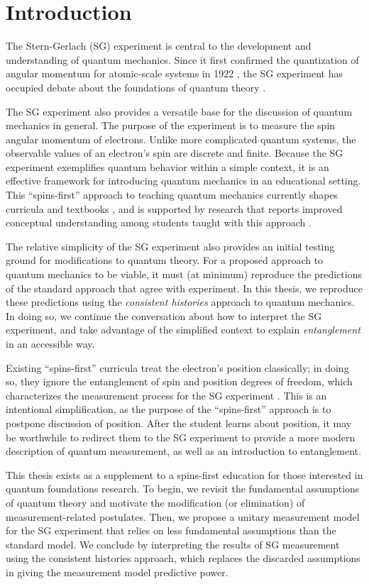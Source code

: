 \chapter{Introduction}

The Stern-Gerlach (SG) experiment is central to the development and understanding of quantum mechanics. Since it first confirmed the quantization of angular momentum for atomic-scale systems in 1922 \cite{stern}, the SG experiment has occupied debate about the foundations of quantum theory \cite{bocking}.

The SG experiment also provides a versatile base for the discussion of quantum mechanics in general. The purpose of the experiment is to measure the spin angular momentum of electrons. Unlike more complicated quantum systems, the observable values of an electron's spin are discrete and finite. Because the SG experiment exemplifies quantum behavior within a simple context, it is an effective framework for introducing quantum mechanics in an educational setting. This ``spins-first'' approach to teaching quantum mechanics currently shapes curricula \cite{gire} and textbooks \cite{mcintyre}, and is supported by research that reports improved conceptual understanding among students taught with this approach \cite{Sadaghiani}.

The relative simplicity of the SG experiment also provides an initial testing ground for modifications to quantum theory. For a proposed approach to quantum mechanics to be viable, it must (at minimum) reproduce the predictions of the standard approach that agree with experiment. In this thesis, we reproduce these predictions using the \textit{consistent histories} approach to quantum mechanics. In doing so, we continue the conversation about how to interpret the SG experiment, and take advantage of the simplified context to explain \textit{entanglement} in an accessible way.

Existing ``spins-first'' curricula treat the electron's position classically; in doing so, they ignore the entanglement of spin and position degrees of freedom, which characterizes the measurement process for the SG experiment \cite{rodriguez}. This is an intentional simplification, as the purpose of the ``spins-first'' approach is to postpone discussion of position. After the student learns about position, it may be worthwhile to redirect them to the SG experiment to provide a more modern description of quantum measurement, as well as an introduction to entanglement.

This thesis exists as a supplement to a spins-first education for those interested in quantum foundations research. To begin, we revisit the fundamental assumptions of quantum theory and motivate the modification (or elimination) of measurement-related postulates. Then, we propose a unitary measurement model for the SG experiment that relies on less fundamental assumptions than the standard model. We conclude by interpreting the results of SG measurement using the consistent histories approach, which replaces the discarded assumptions in giving the measurement model predictive power.

